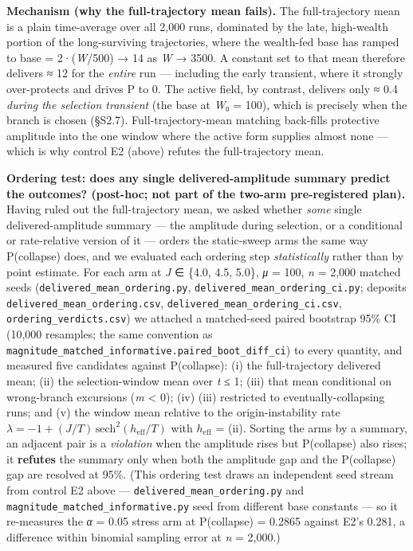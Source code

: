 \documentclass[11pt,letterpaper]{article}
\newcounter{none}
\begin{document}
\textbf{Mechanism (why the full-trajectory mean fails).} The full-trajectory mean is a plain time-average over all 2,000 runs, dominated by the late, high-wealth portion of the long-surviving trajectories, where the wealth-fed base has ramped to base = 2·(\emph{W}/500) → 14 as \emph{W} → 3500. A constant set to that mean therefore delivers ≈ 12 for the \emph{entire} run --- including the early transient, where it strongly over-protects and drives P to 0. The active field, by contrast, delivers only ≈ 0.4 \emph{during the selection transient} (the base at \emph{W}₀ = 100), which is precisely when the branch is chosen (§S2.7). Full-trajectory-mean matching back-fills protective amplitude into the one window where the active form supplies almost none --- which is why control E2 (above) refutes the full-trajectory mean.

\textbf{Ordering test: does any single delivered-amplitude summary predict the outcomes? (post-hoc; not part of the two-arm pre-registered plan).} Having ruled out the full-trajectory mean, we asked whether \emph{some} single delivered-amplitude summary --- the amplitude during selection, or a conditional or rate-relative version of it --- orders the static-sweep arms the same way P(collapse) does, and we evaluated each ordering step \emph{statistically} rather than by point estimate. For each arm at \emph{J} ∈ \{4.0, 4.5, 5.0\}, \emph{μ} = 100, \emph{n} = 2,000 matched seeds (\texttt{delivered\_mean\_ordering.py}, \texttt{delivered\_mean\_ordering\_ci.py}; deposits \texttt{delivered\_mean\_ordering.csv}, \texttt{delivered\_mean\_ordering\_ci.csv}, \texttt{ordering\_verdicts.csv}) we attached a matched-seed paired bootstrap 95\% CI (10,000 resamples; the same convention as \texttt{magnitude\_matched\_informative.paired\_boot\_diff\_ci}) to every quantity, and measured five candidates against P(collapse): (i) the full-trajectory delivered mean; (ii) the selection-window mean over \emph{t} ≤ 1; (iii) that mean conditional on wrong-branch excursions (\emph{m} \textless{} 0); (iv) (iii) restricted to eventually-collapsing runs; and (v) the window mean relative to the origin-instability rate \(\lambda = -1 + (J/T)\,\mathrm{sech}^2(h_{\mathrm{eff}}/T)\) with \(h_{\mathrm{eff}}\) = (ii). Sorting the arms by a summary, an adjacent pair is a \emph{violation} when the amplitude rises but P(collapse) also rises; it \textbf{refutes} the summary only when both the amplitude gap and the P(collapse) gap are resolved at 95\%. (This ordering test draws an independent seed stream from control E2 above --- \texttt{delivered\_mean\_ordering.py} and \texttt{magnitude\_matched\_informative.py} seed from different base constants --- so it re-measures the \emph{α} = 0.05 stress arm at P(collapse) = 0.2865 against E2's 0.281, a difference within binomial sampling error at \emph{n} = 2,000.)
\end{document}
